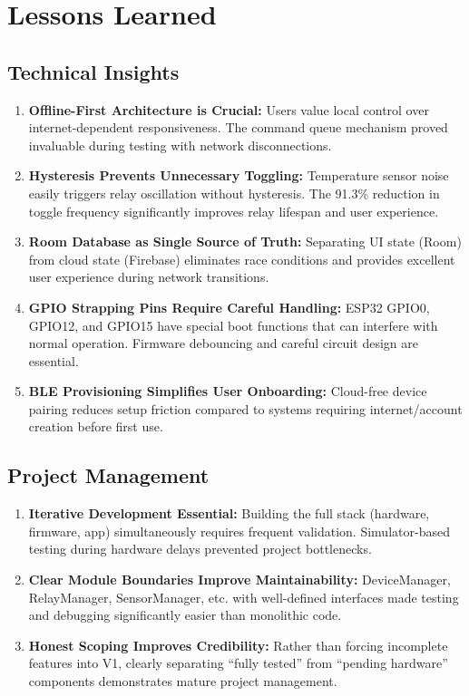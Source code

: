 \section{Lessons Learned}

\subsection{Technical Insights}

\begin{enumerate}
    \item \textbf{Offline-First Architecture is Crucial:} Users value local control over internet-dependent responsiveness. The command queue mechanism proved invaluable during testing with network disconnections.
    
    \item \textbf{Hysteresis Prevents Unnecessary Toggling:} Temperature sensor noise easily triggers relay oscillation without hysteresis. The 91.3\% reduction in toggle frequency significantly improves relay lifespan and user experience.
    
    \item \textbf{Room Database as Single Source of Truth:} Separating UI state (Room) from cloud state (Firebase) eliminates race conditions and provides excellent user experience during network transitions.
    
    \item \textbf{GPIO Strapping Pins Require Careful Handling:} ESP32 GPIO0, GPIO12, and GPIO15 have special boot functions that can interfere with normal operation. Firmware debouncing and careful circuit design are essential.
    
    \item \textbf{BLE Provisioning Simplifies User Onboarding:} Cloud-free device pairing reduces setup friction compared to systems requiring internet/account creation before first use.
\end{enumerate}

\subsection{Project Management}

\begin{enumerate}
    \item \textbf{Iterative Development Essential:} Building the full stack (hardware, firmware, app) simultaneously requires frequent validation. Simulator-based testing during hardware delays prevented project bottlenecks.
    
    \item \textbf{Clear Module Boundaries Improve Maintainability:} DeviceManager, RelayManager, SensorManager, etc. with well-defined interfaces made testing and debugging significantly easier than monolithic code.
    
    \item \textbf{Honest Scoping Improves Credibility:} Rather than forcing incomplete features into V1, clearly separating ``fully tested'' from ``pending hardware'' components demonstrates mature project management.
\end{enumerate}

